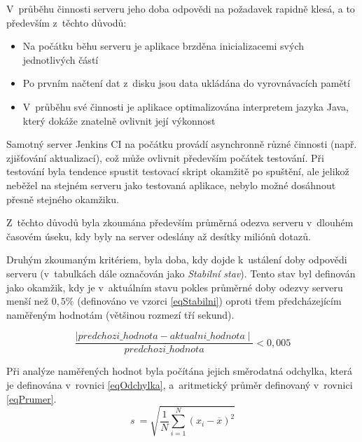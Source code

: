             V~průběhu činnosti serveru jeho doba odpovědi
            na požadavek rapidně klesá, a to především z~těchto důvodů:
            
            \begin{itemize}
                \item Na počátku běhu serveru je aplikace brzděna inicializacemi svých jednotlivých částí
                \item Po prvním načtení dat z~disku jsou data ukládána do vyrovnávacích pamětí
                \item V~průběhu své činnosti je aplikace optimalizována interpretem jazyka Java,
                    který dokáže znatelně ovlivnit její výkonnost
            \end{itemize}

            Samotný server Jenkins CI na počátku provádí asynchronně různé činnosti (např. zjišťování aktualizací),
            což může ovlivnit především počátek testování. Při testování byla tendence spustit testovací 
            skript okamžitě po spuštění, ale jelikož neběžel na stejném serveru jako testovaná
            aplikace, nebylo možné dosáhnout přesně stejného okamžiku. 

            \medskip
            Z~těchto důvodů byla zkoumána především průměrná odezva serveru v~dlouhém časovém
            úseku, kdy byly na server odeslány až desítky miliónů dotazů.

            Druhým zkoumaným kritériem, byla doba, kdy dojde k~ustálení
            doby odpovědi serveru (v~tabulkách dále označován jako \emph{Stabilní stav}).
            Tento stav byl definován jako okamžik, kdy je v~aktuálním stavu
            pokles průměrné doby odezvy serveru 
            menší než $0,5\%$ (definováno ve vzorci \ref{eqStabilni})
            oproti třem předcházejícím naměřeným hodnotám (většinou rozmezí tří sekund).
            
            \begin{equation}\label{eqStabilni}
                \frac{\mid predchozi\_hodnota - aktualni\_hodnota\mid}{predchozi\_hodnota} < 0,005
            \end{equation}
            \medskip

        
            Při analýze naměřených hodnot byla počítána jejich směrodatná odchylka, která je
            definována v~rovnici \ref{eqOdchylka}, a~aritmetický průměr
            definovaný v~rovnici \ref{eqPrumer}.
            \begin{equation}\label{eqOdchylka}
                s~= \sqrt{\frac{1}{N} \sum_{i=1}^N (x_i - \overline{x})^2}      
            \end{equation}

